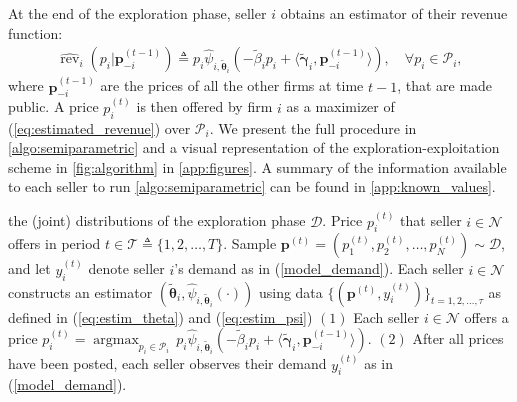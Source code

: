 \documentclass{article} %
\def\eqref#1{equation~\ref{#1}}
\renewcommand{\eqref}[1]{(\ref{#1})}
\begin{document}
At the end of the exploration phase, seller $i$ obtains an estimator of their revenue function:
\begin{align}\label{eq:estimated_revenue}
\textstyle \widehat{\operatorname{rev}}_i(p_i|\mathbf{p}_{-i}^{(t-1)})\triangleq p_i\widehat{\psi}_{i,\widetilde{\boldsymbol{\theta}}_i}( -\widetilde{\beta}_i p_i+\langle\widetilde{\boldsymbol{\gamma}}_i, \mathbf{p}_{-i}^{(t-1)}\rangle),\quad \forall p_i \in \mathcal{P}_i,
\end{align}
where $\mathbf{p}_{-i}^{(t-1)}$ are the prices of all the other firms at time $t-1$, that are made public. A price $p^{(t)}_i$ is then offered by firm $i$ as a maximizer of \eqref{eq:estimated_revenue} over $\mathcal{P}_i$. We present the full procedure in \cref{algo:semiparametric} and a visual representation of the exploration-exploitation scheme in \cref{fig:algorithm} in \cref{app:figures}. A summary of the information available to each seller to run \cref{algo:semiparametric} can be found in \cref{app:known_values}.

\begin{algorithm}[h]
   \caption{SPE-BR (Semi-Parametric Estimation then Best-Response)}\label{algo:semiparametric}
\begin{algorithmic}
    the (joint) distributions of the exploration phase $\mathscr{D}$.
    Price $p_i^{(t)}$ that seller $i \in \mathcal{N}$ offers in period $t \in \mathcal{T}\triangleq \{1,2, \ldots, T\}$.
        \State Sample $\mathbf{p}^{(t)} = (p_1^{(t)},p_2^{(t)},\dots, p_N^{(t)}) \sim \mathscr{D}$, and let $y_i^{(t)}$ denote seller $i$'s demand as in \eqref{model_demand}.
    \EndFor
    \State Each seller $i \in \mathcal{N}$ constructs an estimator $(\widetilde{\boldsymbol{\theta}}_i,\widehat{\psi}_{i,\widetilde{\boldsymbol{\theta}}_i}(\cdot))$ using data $\{(\mathbf{p}^{(t)}, y_i^{(t)})\}_{t=1,2, \ldots,\tau}$ as defined in \eqref{eq:estim_theta} and \eqref{eq:estim_psi} 
    \State $(1)$ Each seller $i \in \mathcal{N}$ offers a price $p_i^{(t)} = \operatorname{argmax}_{p_i \in \mathcal{P}_i} \, p_i \widehat{\psi}_{i,\widetilde{\boldsymbol{\theta}}_i}( -\widetilde{\beta}_i p_i+\langle\widetilde{\boldsymbol{\gamma}}_i, \mathbf{p}_{-i}^{(t-1)}\rangle)$.
    \State $(2)$ After all prices have been posted, each seller observes their demand $y_i^{(t)}$ as in \eqref{model_demand}.
   \EndFor
\end{algorithmic}
\end{algorithm}
\end{document}
